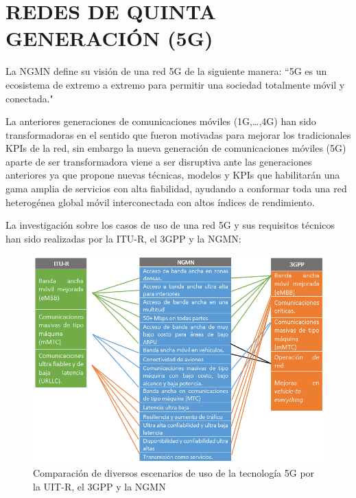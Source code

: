 
\section{REDES DE QUINTA GENERACIÓN (5G)}

La NGMN define su visión de una red 5G de la siguiente manera: ``5G es un ecosistema de extremo a extremo para permitir una sociedad totalmente móvil y conectada."\newline

La anteriores generaciones de comunicaciones móviles (1G,{\dots},4G) han sido transformadoras en el sentido que fueron motivadas para mejorar los tradicionales KPIs de la red, sin embargo la nueva generación de comunicaciones móviles (5G) aparte de ser transformadora viene a ser disruptiva ante las generaciones anteriores ya que propone nuevas técnicas, modelos y KPIs que habilitarán una gama amplia de servicios con alta fiabilidad, ayudando a conformar toda una red heterogénea global móvil interconectada con altos índices de rendimiento.\newline

La investigación sobre los casos de uso de una red 5G y sus requisitos técnicos han sido realizadas por la ITU-R, el 3GPP y la NGMN:

\begin{figure}[th]
\centering
\includegraphics[scale=1]{Figures/Comparación de diversos escenarios de uso de la tecnología 5G}
\decoRule
\caption[Comparación de diversos escenarios de uso de la tecnología 5G por la UIT-R, el 3GPP y la NGMN]{Comparación de diversos escenarios de uso de la tecnología 5G por la UIT-R, el 3GPP y la NGMN}
\label{fig:5g}
\end{figure}

